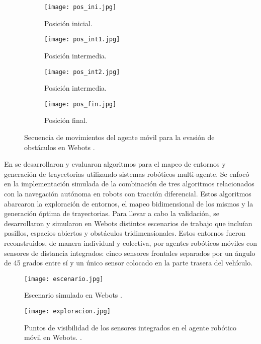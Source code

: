 \begin{figure}[H]
	\begin{subfigure}{0.5\textwidth}
		\centering
		\texttt{[image: pos\_ini.jpg]}
		\caption{Posición inicial.}
	\end{subfigure}
	\begin{subfigure}{0.5\textwidth}
		\centering
		\texttt{[image: pos\_int1.jpg]}
		\caption{Posición intermedia.}
	\end{subfigure}
	\begin{subfigure}{0.5\textwidth}
		\centering
		\texttt{[image: pos\_int2.jpg]}
		\caption{Posición intermedia.}
	\end{subfigure}
	\begin{subfigure}{0.5\textwidth}
		\centering
		\texttt{[image: pos\_fin.jpg]}
		\caption{Posición final.}
	\end{subfigure}
	\caption{Secuencia de movimientos del agente móvil para la evasión de obstáculos en Webots \cite{baldizon_garcia_aplicaciones_2022}.}
	\label{fig2_6}
\end{figure}


En \cite{godoy_lucero_desarrollo_2023} se desarrollaron y evaluaron algoritmos para el mapeo de entornos y generación de trayectorias utilizando sistemas robóticos multi-agente. Se enfocó en la implementación simulada de la combinación de tres algoritmos relacionados con la navegación autónoma en robots con tracción diferencial. Estos algoritmos abarcaron la exploración de entornos, el mapeo bidimensional de los mismos y la generación óptima de trayectorias. Para llevar a cabo la validación, se desarrollaron y simularon en Webots distintos escenarios de trabajo que incluían pasillos,  espacios abiertos y obstáculos tridimensionales. Estos entornos fueron reconstruidos,  de manera individual y colectiva, por agentes robóticos móviles con sensores de distancia integrados: cinco sensores frontales separados por un ángulo de 45 grados entre sí y un único sensor colocado en la parte trasera del vehículo.

\begin{figure}[H]
	\centering
	\texttt{[image: escenario.jpg]}
	\caption{Escenario simulado en Webots \cite{godoy_lucero_desarrollo_2023}.}
	\label{fig2_7}
\end{figure}

\begin{figure}[H]
	\centering
	\texttt{[image: exploracion.jpg]}
	\caption{Puntos de visibilidad de los sensores integrados en el agente robótico móvil en Webots. \cite{godoy_lucero_desarrollo_2023}.}
	\label{fig2_8}
\end{figure}


